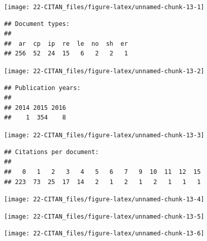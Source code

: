 \documentclass[]{book}
\begin{document}
\begin{center}\texttt{[image: 22-CITAN\_files/figure-latex/unnamed-chunk-13-1]} \end{center}

\begin{verbatim}
## Document types:
## 
##  ar  cp  ip  re  le  no  sh  er 
## 256  52  24  15   6   2   2   1
\end{verbatim}

\begin{center}\texttt{[image: 22-CITAN\_files/figure-latex/unnamed-chunk-13-2]} \end{center}

\begin{verbatim}
## Publication years:
## 
## 2014 2015 2016 
##    1  354    8
\end{verbatim}

\begin{center}\texttt{[image: 22-CITAN\_files/figure-latex/unnamed-chunk-13-3]} \end{center}

\begin{verbatim}
## Citations per document:
## 
##   0   1   2   3   4   5   6   7   9  10  11  12  15 
## 223  73  25  17  14   2   1   2   1   2   1   1   1
\end{verbatim}

\begin{center}\texttt{[image: 22-CITAN\_files/figure-latex/unnamed-chunk-13-4]} \end{center}

\begin{center}\texttt{[image: 22-CITAN\_files/figure-latex/unnamed-chunk-13-5]} \end{center}

\begin{center}\texttt{[image: 22-CITAN\_files/figure-latex/unnamed-chunk-13-6]} \end{center}
\end{document}
